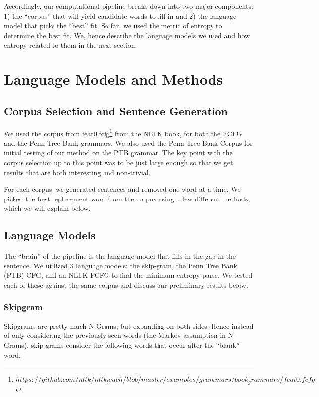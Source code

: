 \documentclass{article}[12pt]
\theoremstyle{definition}
\begin{document}
Accordingly, our computational pipeline breaks down into two major components: 1) the “corpus” that will yield candidate words to fill in and 2) the language model that picks the “best” fit. So far, we used the metric of entropy to determine the best fit. We, hence describe the language models we used and how entropy related to them in the next section. 

\section{Language Models and Methods}

\subsection{Corpus Selection and Sentence Generation}

We used the corpus from feat0.fcfg\footnote{$https://github.com/nltk/nltk_teach/blob/master/examples/grammars/book_grammars/feat0.fcfg$} from the NLTK book, for both the FCFG and the Penn Tree Bank grammars. We also used the Penn Tree Bank Corpus for initial testing of our method on the PTB grammar. The key point with the corpus selection up to this point was to be just large enough so that we get results that are both interesting and non-trivial. \newline

For each corpus, we generated sentences and removed one word at a time. We picked the best replacement word from the corpus using a few different methods, which we will explain below. \\

\subsection{Language Models}

The “brain” of the pipeline is the language model that fills in the gap in the sentence. We utilized 3 language models: the skip-gram, the Penn Tree Bank (PTB) CFG, and an NLTK FCFG to find the minimum entropy parse. We tested each of these against the same corpus and discuss our preliminary results below. 

\subsubsection{Skipgram}

Skipgrams are pretty much N-Grams, but expanding on both sides. Hence instead of only considering the previously seen words (the Markov assumption in N-Grams), skip-grams consider the following words that occur after the “blank” word. \\
\end{document}
